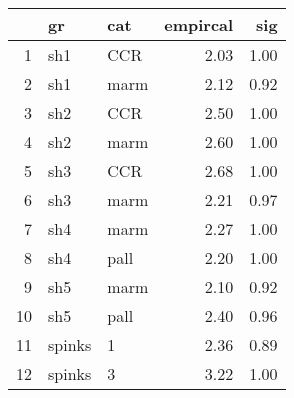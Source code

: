 \begin{table}[ht]
\centering
\begin{tabular}{rllrr}
  \hline
 & gr & cat & empircal & sig \\ 
  \hline
1 & sh1 & CCR & 2.03 & 1.00 \\ 
  2 & sh1 & marm & 2.12 & 0.92 \\ 
  3 & sh2 & CCR & 2.50 & 1.00 \\ 
  4 & sh2 & marm & 2.60 & 1.00 \\ 
  5 & sh3 & CCR & 2.68 & 1.00 \\ 
  6 & sh3 & marm & 2.21 & 0.97 \\ 
  7 & sh4 & marm & 2.27 & 1.00 \\ 
  8 & sh4 & pall & 2.20 & 1.00 \\ 
  9 & sh5 & marm & 2.10 & 0.92 \\ 
  10 & sh5 & pall & 2.40 & 0.96 \\ 
  11 & spinks & 1 & 2.36 & 0.89 \\ 
  12 & spinks & 3 & 3.22 & 1.00 \\ 
   \hline
\end{tabular}
\label{mmmiss}
\end{table}
